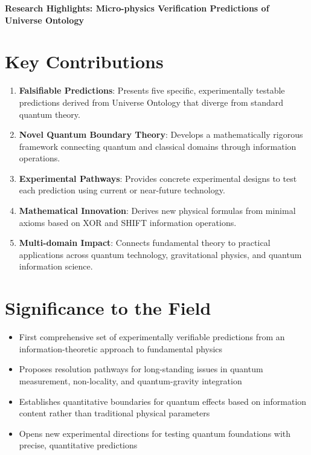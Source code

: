 \documentclass[11pt,letterpaper]{article}
\begin{document}
\begin{center}
\Large\textbf{Research Highlights: Micro-physics Verification Predictions of Universe Ontology}
\end{center}

\section*{Key Contributions}

\begin{enumerate}[leftmargin=*]
\item \textbf{Falsifiable Predictions}: Presents five specific, experimentally testable predictions derived from Universe Ontology that diverge from standard quantum theory.

\item \textbf{Novel Quantum Boundary Theory}: Develops a mathematically rigorous framework connecting quantum and classical domains through information operations.

\item \textbf{Experimental Pathways}: Provides concrete experimental designs to test each prediction using current or near-future technology.

\item \textbf{Mathematical Innovation}: Derives new physical formulas from minimal axioms based on XOR and SHIFT information operations.

\item \textbf{Multi-domain Impact}: Connects fundamental theory to practical applications across quantum technology, gravitational physics, and quantum information science.
\end{enumerate}

\section*{Significance to the Field}

\begin{itemize}[leftmargin=*]
\item First comprehensive set of experimentally verifiable predictions from an information-theoretic approach to fundamental physics

\item Proposes resolution pathways for long-standing issues in quantum measurement, non-locality, and quantum-gravity integration

\item Establishes quantitative boundaries for quantum effects based on information content rather than traditional physical parameters

\item Opens new experimental directions for testing quantum foundations with precise, quantitative predictions
\end{itemize}
\end{document}
